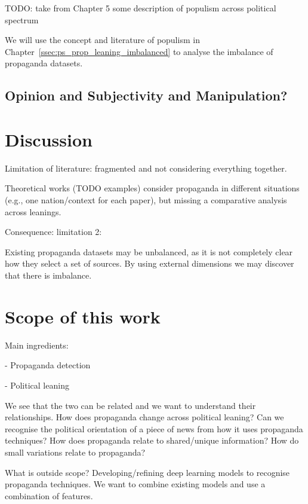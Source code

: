 
TODO: take from Chapter 5 some description of populism across political spectrum

We will use the concept and literature of \gls{populism} in Chapter~\ref{ssec:ps_prop_leaning_imbalanced} to analyse the imbalance of propaganda datasets.


\subsection{Opinion and Subjectivity and Manipulation?}


\section{\statusred Discussion}
\label{sec:lit_discussion}

Limitation of literature: fragmented and not considering everything together.

Theoretical works (TODO examples) consider propaganda in different situations (e.g., one nation/context for each paper), but missing a comparative analysis across leanings.



Consequence: limitation 2:

Existing propaganda datasets may be unbalanced, as it is not completely clear how they select a set of sources. By using external dimensions we may discover that there is imbalance.

\section{\statusred Scope of this work}
\label{sec:lit_scope}

Main ingredients:

- Propaganda detection

- Political leaning

We see that the two can be related and we want to understand their relationships.
How does propaganda change across political leaning?
Can we recognise the political orientation of a piece of news from how it uses propaganda techniques?
How does propaganda relate to shared/unique information? How do small variations relate to propaganda?

What is outside scope?
Developing/refining deep learning models to recognise propaganda techniques. We want to combine existing models and use a combination of features.
